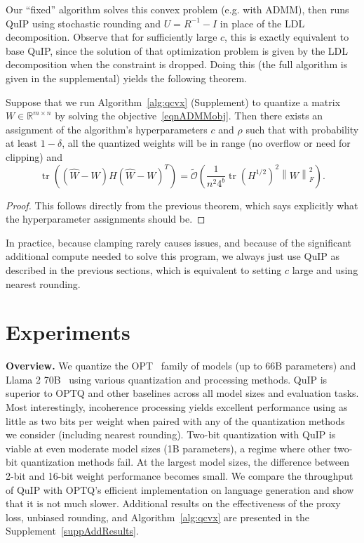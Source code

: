 Our ``fixed'' algorithm solves this convex problem (e.g. with ADMM), then runs QuIP using stochastic rounding and $U = R^{-1} - I$ in place of the LDL decomposition. Observe that for sufficiently large $c$, this is exactly equivalent to base QuIP, since the solution of that optimization problem is given by the LDL decomposition when the constraint is dropped. Doing this (the full algorithm is given in the supplemental) yields the following theorem.

\begin{theoremrep}
Suppose that we run Algorithm~\ref{alg:qcvx} (Supplement) to quantize a matrix $W \in \mathbb{R}^{m \times n}$ by solving the objective~\eqref{eqnADMMobj}. Then there exists an assignment of the algorithm's hyperparameters $c$ and $\rho$ such that with probability at least $1 - \delta$, all the quantized weights will be in range (no overflow or need for clipping) and
\[
	\operatorname{tr}\left( (\hat W - W) H (\hat W - W)^T \right)
	=
	\tilde{\mathcal{O}}\left( \frac{1}{n^2 4^b} \operatorname{tr}\left(H^{1/2}\right)^2 \left\|W\right\|_{F}^2 \right).
\]
\end{theoremrep}

\begin{proof}
This follows directly from the previous theorem, which says explicitly what the hyperparameter assignments should be.
\end{proof}

In practice, because clamping rarely causes issues, and because of the significant additional compute needed to solve this program, we always just use QuIP as described in the previous sections, which is equivalent to setting $c$ large and using nearest rounding.

\section{Experiments}\label{secExp}

\textbf{Overview.}
We quantize the OPT~\citep{meta2022opt} family of models (up to 66B parameters) and Llama 2 70B~\citep{meta2023llama} using various quantization and processing methods. QuIP is superior to OPTQ and other baselines across all model sizes and evaluation tasks. Most interestingly, incoherence processing yields excellent performance using as little as two bits per weight when paired with any of the quantization methods we consider (including nearest rounding). Two-bit quantization with QuIP is viable at even moderate model sizes (1B parameters), a regime where other two-bit quantization methods fail. At the largest model sizes, the difference between 2-bit and 16-bit weight performance becomes small. We compare the throughput of QuIP with OPTQ's efficient implementation on language generation and show that it is not much slower. Additional results on the effectiveness of the proxy loss, unbiased rounding, and Algorithm~\ref{alg:qcvx} are presented in the Supplement~\ref{suppAddResults}.

